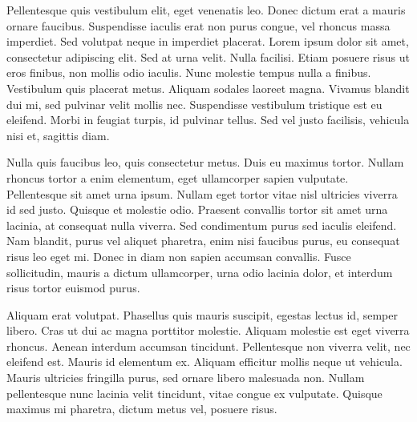Pellentesque quis vestibulum elit, eget venenatis leo. 
Donec dictum erat a mauris ornare faucibus. 
Suspendisse iaculis erat non purus congue, vel rhoncus massa imperdiet. 
Sed volutpat neque in imperdiet placerat. Lorem ipsum dolor sit amet, consectetur adipiscing elit. 
Sed at urna velit. 
Nulla facilisi. 
Etiam posuere risus ut eros finibus, non mollis odio iaculis. 
Nunc molestie tempus nulla a finibus. Vestibulum quis placerat metus. 
Aliquam sodales laoreet magna. 
Vivamus blandit dui mi, sed pulvinar velit mollis nec. 
Suspendisse vestibulum tristique est eu eleifend. 
Morbi in feugiat turpis, id pulvinar tellus. 
Sed vel justo facilisis, vehicula nisi et, sagittis diam.

Nulla quis faucibus leo, quis consectetur metus. 
Duis eu maximus tortor. 
Nullam rhoncus tortor a enim elementum, eget ullamcorper sapien vulputate. 
Pellentesque sit amet urna ipsum. 
Nullam eget tortor vitae nisl ultricies viverra id sed justo. 
Quisque et molestie odio. 
Praesent convallis tortor sit amet urna lacinia, at consequat nulla viverra. 
Sed condimentum purus sed iaculis eleifend. 
Nam blandit, purus vel aliquet pharetra, enim nisi faucibus purus, eu consequat risus leo eget mi. 
Donec in diam non sapien accumsan convallis. 
Fusce sollicitudin, mauris a dictum ullamcorper, urna odio lacinia dolor, et interdum risus tortor euismod purus.

Aliquam erat volutpat. 
Phasellus quis mauris suscipit, egestas lectus id, semper libero. 
Cras ut dui ac magna porttitor molestie. 
Aliquam molestie est eget viverra rhoncus. 
Aenean interdum accumsan tincidunt. 
Pellentesque non viverra velit, nec eleifend est. 
Mauris id elementum ex. 
Aliquam efficitur mollis neque ut vehicula. 
Mauris ultricies fringilla purus, sed ornare libero malesuada non. 
Nullam pellentesque nunc lacinia velit tincidunt, vitae congue ex vulputate. 
Quisque maximus mi pharetra, dictum metus vel, posuere risus.
